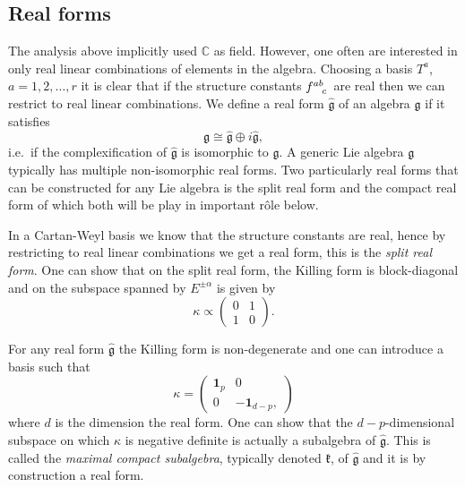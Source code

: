 \subsection{Real forms}
The analysis above implicitly used $\mathbb{C}$ as field. However, one often are interested in only real linear combinations of elements in the algebra. Choosing a basis $T^a$, $a=1,2,\ldots, r$ it is clear that if the structure constants $\tensor{f}{^{ab}_c}$ are real then we can restrict to real linear combinations. We define a real form $\hat{\mathfrak{g}}$ of an algebra $\mathfrak{g}$ if it satisfies 
\begin{equation}
    \mathfrak{g} \cong \hat{\mathfrak{g}}\oplus i\hat{\mathfrak{g}},
\end{equation}
i.e.\ if the complexification of $\hat{\mathfrak{g}}$ is isomorphic to $\mathfrak{g}$. A generic Lie algebra $\mathfrak{g}$ typically has multiple non-isomorphic real forms. Two particularly real forms that can be constructed for any Lie algebra is the split real form and the compact real form of which both will be play in important rôle below. 

In a Cartan-Weyl basis we know that the structure constants are real, hence by restricting to real linear combinations we get a real form, this is the \emph{split real form}. One can show that on the split real form, the Killing form is block-diagonal and on the subspace spanned by $E^{\pm\alpha}$ is given by 
\begin{equation}
    \kappa \propto \begin{pmatrix} 0&1\\1&0\end{pmatrix}.
\end{equation}

For any real form $\hat{\mathfrak{g}}$ the Killing form is non-degenerate and one can introduce a basis such that 
\begin{equation}
    \kappa = \begin{pmatrix}\mathbf{1}_p& 0\\0&-\mathbf{1}_{d-p},
    \end{pmatrix}
\end{equation}
where $d$ is the dimension the real form. One can show that the $d-p$-dimensional subspace on which $\kappa$ is negative definite is actually a subalgebra of $\hat{\mathfrak{g}}$. This is called the \emph{maximal compact subalgebra}, typically denoted $\mathfrak{k}$, of $\hat{\mathfrak{g}}$ and it is by construction a real form.

